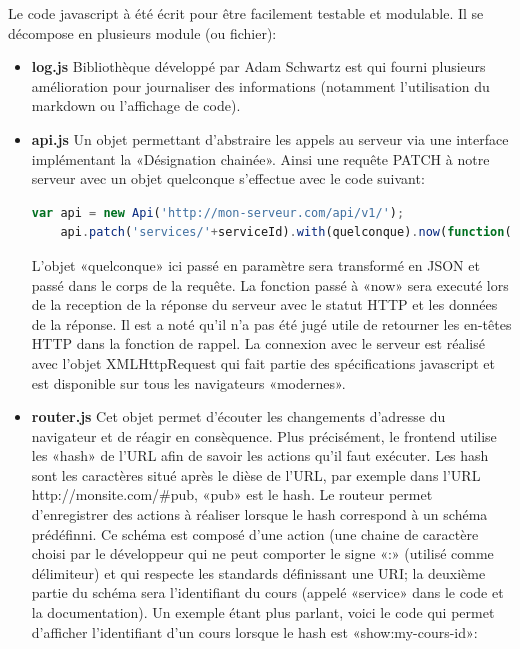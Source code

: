 \documentclass[a4paper,11pt]{report}
\begin{document}
Le code javascript à été écrit pour être facilement testable et modulable. Il se décompose en plusieurs module (ou fichier):

\begin{itemize}
  \item \textbf{log.js} Bibliothèque développé par Adam Schwartz est qui fourni plusieurs amélioration pour journaliser des informations (notamment l'utilisation du markdown ou l'affichage de code).
  \item \textbf{api.js} Un objet permettant d'abstraire les appels au serveur via une interface implémentant la «Désignation chainée». Ainsi une requête PATCH à notre serveur avec un objet quelconque s'effectue avec le code suivant:
    \begin{lstlisting}[language=javascript,caption={Requête PATCH à l'api}]
    var api = new Api('http://mon-serveur.com/api/v1/');
    api.patch('services/'+serviceId).with(quelconque).now(function(status, data){});
    \end{lstlisting}
    L'objet «quelconque» ici passé en paramètre sera transformé en JSON et passé dans le corps de la requête. La fonction passé à «now» sera executé lors de la reception de la réponse du serveur avec le statut HTTP et les données de la réponse. Il est a noté qu'il n'a pas été jugé utile de retourner les en-têtes HTTP dans la fonction de rappel. La connexion avec le serveur est réalisé avec l'objet XMLHttpRequest qui fait partie des spécifications javascript et est disponible sur tous les navigateurs «modernes».
  \item \textbf{router.js} Cet objet permet d'écouter les changements d'adresse du navigateur et de réagir en consèquence. Plus précisément, le frontend utilise les «hash» de l'URL afin de savoir les actions qu'il faut exécuter. Les hash sont les caractères situé après le dièse de l'URL, par exemple dans l'URL http://monsite.com/\#pub, «pub» est le hash.
  Le routeur permet d'enregistrer des actions à réaliser lorsque le hash correspond à un schéma prédéfinni. Ce schéma est composé d'une action (une chaine de caractère choisi par le développeur qui ne peut comporter le signe «:» (utilisé comme délimiteur) et qui respecte les standards définissant une URI; la deuxième partie du schéma sera l'identifiant du cours (appelé «service» dans le code et la documentation).
  Un exemple étant plus parlant, voici le code qui permet d'afficher l'identifiant d'un cours lorsque le hash est «show:my-cours-id»:
    \begin{lstlisting}[language=javascript,caption={Affichage identifiant avec le routeur}]

\end{lstlisting}
\end{itemize}
\end{document}
